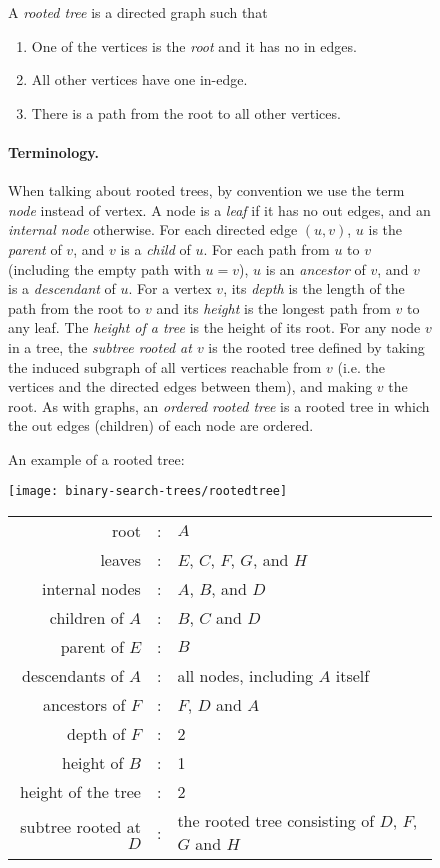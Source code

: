 \begin{figure}
\begin{definition}
\label{def:rootedtree}
A \emph{rooted tree} is a directed graph such that
\begin{enumerate}
\item 
One of the vertices is the \emph{root} and it has no in edges.
\item 
All other vertices have one in-edge.
\item
There is a path from the root to all other vertices.
\end{enumerate}
\paragraph{Terminology.} \rm
When talking about rooted trees, by convention we use the term
\emph{node} instead of vertex.  A node is a \emph{leaf} if it has no
out edges, and an \emph{internal node} otherwise.  For each directed
edge $(u,v)$, $u$ is the \emph{parent} of $v$, and $v$ is a
\emph{child} of $u$.  For each path from $u$ to $v$ (including the
empty path with $u = v$), $u$ is an \emph{ancestor} of $v$, and $v$ is
a \emph{descendant} of $u$.  For a vertex $v$, its \emph{depth} is the
length of the path from the root to $v$ and its \emph{height} is the
longest path from $v$ to any leaf.  The \emph{height of a tree} is the
height of its root.  For any node $v$ in a tree, the \emph{subtree
  rooted at $v$} is the rooted tree defined by taking the induced
subgraph of all vertices reachable from $v$ (i.e. the vertices and the
directed edges between them), and making $v$ the root.  As with
graphs, an \emph{ordered rooted tree} is a rooted tree in which the
out edges (children) of each node are ordered.
\end{definition}

\begin{example}
\label{ex:rootedtree}
An example of a rooted tree:
\begin{center}
  \texttt{[image: binary-search-trees/rootedtree]}
\end{center}
\begin{center}
\begin{tabular}{rcl}
root & : & $A$\\
leaves & : & $E$, $C$, $F$, $G$, and $H$\\
internal nodes & : & $A$, $B$, and $D$\\
children of $A$ & : & $B$, $C$ and $D$\\
parent of $E$ & : & $B$\\
descendants of $A$ & : & all nodes, including $A$ itself\\
ancestors of $F$ & : & $F$, $D$ and $A$\\
depth of $F$ & : & 2\\
height of $B$ & : & 1\\
height of the tree & : & 2\\
subtree rooted at $D$ & : & the rooted tree consisting of $D$, $F$, $G$ and $H$
\end{tabular}
\end{center}
\end{example}
\end{figure}

